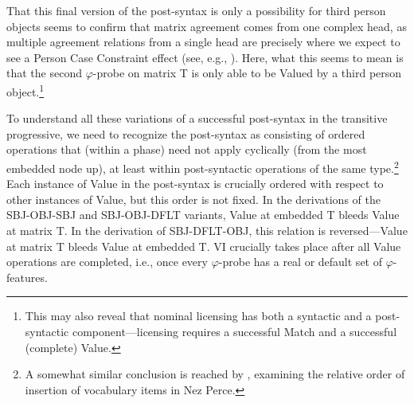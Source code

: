 \documentclass[output=paper
,modfonts
,nonflat]{langsci/langscibook}
\begin{document}

\noindent That this final version of the post-syntax is only a possibility for third person objects seems to confirm that matrix agreement comes from one complex head, as multiple agreement relations from a single head are precisely where we expect to see a Person Case Constraint effect (see, e.g., \citealt{Anagnostopoulou03,BejarRezac03,AdgerHarbour07,Rezac08,Rezac11}). Here, what this seems to mean is that the second $\varphi$-probe on matrix T is only able to be Valued by a third person object.\footnote{This may also reveal that nominal licensing has both a syntactic and a post-syntactic component---licensing requires a successful Match and a successful (complete) Value.}

To understand all these variations of a successful post-syntax in the transitive progressive, we need to recognize the post-syntax as consisting of ordered operations that (within a phase) need not apply cyclically (from the most embedded node up), at least within post-syntactic operations of the same type.\footnote{A somewhat similar conclusion is reached by \citet{DealWolf17}, examining the relative order of insertion of vocabulary items in Nez Perce.} Each instance of Value in the post-syntax is crucially ordered with respect to other instances of Value, but this order is not fixed. In the derivations of the SBJ-OBJ-SBJ and SBJ-OBJ-DFLT variants, Value at embedded T bleeds Value at matrix T. In the derivation of SBJ-DFLT-OBJ, this relation is reversed---Value at matrix T bleeds Value at embedded T. VI crucially takes place after all Value operations are completed, i.e., once every $\varphi$-probe has a real or default set of $\varphi$-features.
\end{document}

